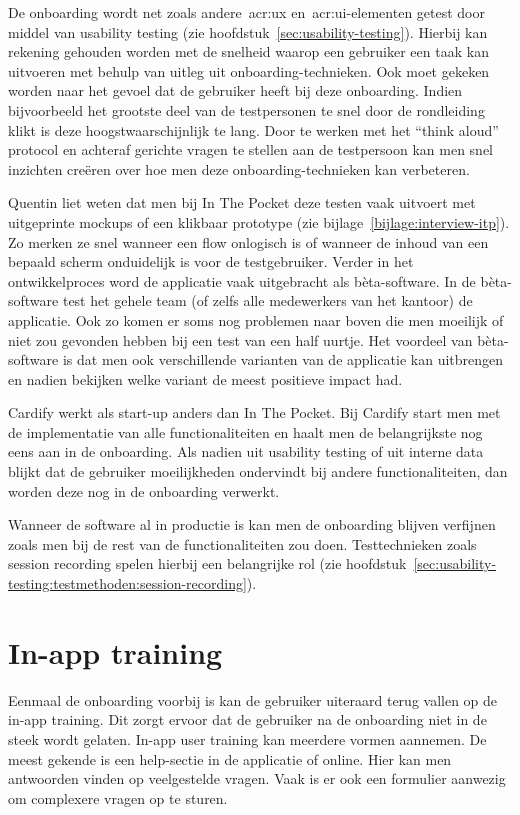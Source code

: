 De onboarding wordt net zoals andere~\acrshort{acr:ux} en~\acrshort{acr:ui}-elementen getest door middel van usability testing (zie hoofdstuk~\ref{sec:usability-testing}). Hierbij kan rekening gehouden worden met de snelheid waarop een gebruiker een taak kan uitvoeren met behulp van uitleg uit onboarding-technieken. Ook moet gekeken worden naar het gevoel dat de gebruiker heeft bij deze onboarding. Indien bijvoorbeeld het grootste deel van de testpersonen te snel door de rondleiding klikt is deze hoogstwaarschijnlijk te lang. Door te werken met het ``think aloud'' protocol en achteraf gerichte vragen te stellen aan de testpersoon kan men snel inzichten creëren over hoe men deze onboarding-technieken kan verbeteren.

Quentin liet weten dat men bij In The Pocket deze testen vaak uitvoert met uitgeprinte mockups of een klikbaar prototype (zie bijlage~\ref{bijlage:interview-itp}). Zo merken ze snel wanneer een flow onlogisch is of wanneer de inhoud van een bepaald scherm onduidelijk is voor de testgebruiker. Verder in het ontwikkelproces word de applicatie vaak uitgebracht als bèta-software. In de bèta-software test het gehele team (of zelfs alle medewerkers van het kantoor) de applicatie. Ook zo komen er soms nog problemen naar boven die men moeilijk of niet zou gevonden hebben bij een test van een half uurtje. Het voordeel van bèta-software is dat men ook verschillende varianten van de applicatie kan uitbrengen en nadien bekijken welke variant de meest positieve impact had.

Cardify werkt als start-up anders dan In The Pocket. Bij Cardify start men met de implementatie van alle functionaliteiten en haalt men de belangrijkste nog eens aan in de onboarding. Als nadien uit usability testing of uit interne data blijkt dat de gebruiker moeilijkheden ondervindt bij andere functionaliteiten, dan worden deze nog in de onboarding verwerkt.

Wanneer de software al in productie is kan men de onboarding blijven verfijnen zoals men bij de rest van de functionaliteiten zou doen. Testtechnieken zoals session recording spelen hierbij een belangrijke rol (zie hoofdstuk~\ref{sec:usability-testing:testmethoden:session-recording}).

\section{In-app training}
\label{sec:in-app-training}

Eenmaal de onboarding voorbij is kan de gebruiker uiteraard terug vallen op de in-app training. Dit zorgt ervoor dat de gebruiker na de onboarding niet in de steek wordt gelaten. In-app user training kan meerdere vormen aannemen. De meest gekende is een help-sectie in de applicatie of online. Hier kan men antwoorden vinden op veelgestelde vragen. Vaak is er ook een formulier aanwezig om complexere vragen op te sturen.

